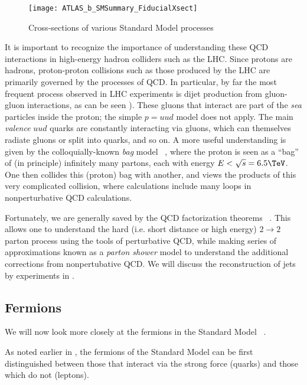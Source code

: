 \begin{sidewaysfigure}[htbp]
\caption{Cross-sections of various Standard Model processes}
\label{fig:sm_xsec}
\texttt{[image: ATLAS\_b\_SMSummary\_FiducialXsect]}
\end{sidewaysfigure}

It is important to recognize the importance of understanding these QCD interactions in high-energy hadron colliders such as the LHC.
Since protons are hadrons, proton-proton collisions such as those produced by the LHC are primarily governed by the processes of QCD.
In particular, by far the most frequent process observed in LHC experiments is dijet production from gluon-gluon interactions, as can be seen ).
These gluons that interact are part of the \textit{sea} particles inside the proton; the simple $p = uud$ model does not apply.
The main \textit{valence} $uud$ quarks are constantly interacting via gluons, which can themselves radiate gluons or split into quarks, and so on.
A more useful understanding is given by the colloquially-known \textit{bag} model ~\cite{Chodos:1974je, Chodos:1974pn}, where the proton is seen as a ``bag'' of (in principle) infinitely many partons, each with energy $ E < \sqrt{s} = 6.5 \TeV$.
One then collides this (proton) bag with another, and views the products of this very complicated collision, where calculations include many loops in nonperturbative QCD calculations.

Fortunately, we are generally saved by the QCD factorization theorems ~\cite{Collins:1989gx}.
This allows one to understand the hard (i.e. short distance or high energy) $2 \rightarrow 2$ parton process using the tools of perturbative QCD, while making series of approximations known as a \textit{parton shower} model to understand the additional corrections from nonpertubative QCD.
We will discuss the reconstruction of jets by experiments in .

\subsection{Fermions}

We will now look more closely at the fermions in the Standard Model ~\cite{Agashe:2014kda}.

As noted earlier in , the fermions of the Standard Model can be first distinguished between those that interact via the strong force (quarks) and those which do not (leptons).

